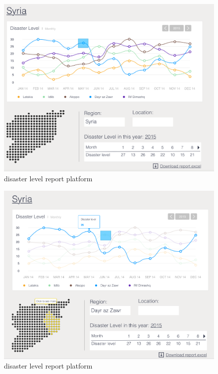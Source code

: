       \noindent\begin{minipage}{.45\textwidth}
      \begin{figure}[H]
      \centering
      \includegraphics[width=\textwidth]{figures/function-stakeholder-1}
      \caption{disaster level report platform}
      \label{fig:stakeholder1}
      \end{figure}
      \end{minipage}\hfill
      \noindent\begin{minipage}{.45\textwidth}
      \begin{figure}[H]
      \centering
      \includegraphics[width=\textwidth]{figures/function-stakeholder-2}
      \caption{disaster level report platform}
      \label{fig:stakeholder2}
      \end{figure}
      \end{minipage}\hfill


